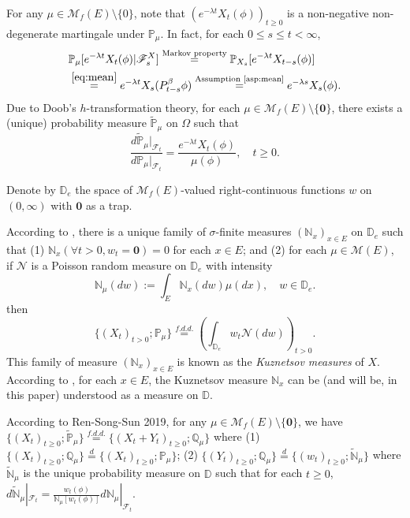 \documentclass[12pt,a4paper]{amsart}
\numberwithin{equation}{section}
\theoremstyle{plain}
\theoremstyle{definition}
\theoremstyle{remark}
\begin{document}
For any $\mu \in \mathcal M_f(E)\setminus\{0\}$, note that $(e^{- \lambda t} X_t(\phi))_{t\geq 0}$ is a non-negative non-degenerate martingale under $\mathbb P_\mu$.
In fact, for each $0\leq s\leq t< \infty$,
\begin{align}
&\mathbb P_\mu[e^{-\lambda t}X_t(\phi)|\mathscr F^X_s] 
\overset{\text{Markov property}} = \mathbb P_{X_s}[e^{-\lambda t} X_{t-s}(\phi)]
\\&\overset{\eqref{eq:mean}}= e^{-\lambda t}X_s(P_{t-s}^\beta \phi)
\overset{\text{Assumption \ref{asp:mean}}}=e^{-\lambda s}X_s(\phi).
\end{align}
Due to Doob's $h$-transformation theory, for each $\mu \in \mathcal M_f(E)\setminus\{\mathbf 0\}$, there exists a (unique) probability measure $\widetilde {\mathbb P}_\mu$  on $\Omega$ such that
\begin{equation} \label{eq: martingale transformation}
\frac{d\widetilde{\mathbb P}_\mu|_{\mathscr F_t}}{d\mathbb P_\mu|_{\mathscr F_t}}
=\frac{e^{-\lambda t}X_t(\phi)}{\mu(\phi) },
\quad t\geq 0.
\end{equation}

Denote by $\mathbb D_e$ the space of $\mathcal M_f(E)$-valued right-continuous functions $w$ on $(0,\infty)$ with $\mathbf 0$ as a trap.

According to \cite[Section 8.4]{Li2011Measure-valued}, there is a unique family of $\sigma$-finite measures $(\mathbb N_x)_{x\in E}$ on $\mathbb D_e$ such that (1) $\mathbb N_x (\forall t > 0, w_t =\mathbf 0) =0$ for each $x\in E$; and (2) for each $\mu \in \mathcal M(E)$, if $\mathcal N$ is a Poisson random measure on $\mathbb D_e$ with intensity
\[
\mathbb N_\mu(dw):= \int_E \mathbb N_x(dw)\mu(dx), \quad w\in \mathbb D_e.
\]
then
\[
\{(X_t)_{t> 0};\mathbb P_\mu\}
\overset{f.d.d.}{=} \left(\int_{\mathbb D_e} w_t\mathcal N(dw)\right)_{t> 0}.
\]
This family of measure $(\mathbb N_x)_{x\in E}$ is known as the \emph{Kuznetsov measures} of $X$.
According to \cite[Theorem 8.22]{Li2011Measure-valued}, for each $x\in E$, the Kuznetsov measure $\mathbb N_x$ can be (and will be, in this paper) understood as a measure on $\mathbb D$.


According to Ren-Song-Sun 2019, for any $\mu \in \mathcal M_f(E)\setminus \{\mathbf 0\}$, we have $\{(X_t)_{t\geq 0}; \widetilde {\mathbb P}_\mu\} \overset{f.d.d.} = \{ (X_t+ Y_t)_{t\geq 0}; \mathbb Q_\mu\} $ where (1) $\{(X_t)_{t\geq 0}; \mathbb Q_\mu\} \overset{d} =  \{(X_t)_{t\geq 0}; \mathbb P_\mu\}$; (2) $\{(Y_t)_{t\geq 0}; \mathbb Q_\mu \} \overset{d} = \{(w_t)_{t\geq 0}; \widetilde{ \mathbb N}_\mu\}$ where $\widetilde {\mathbb N}_\mu$ is the unique probability measure on $\mathbb D$ such that for each $t\geq 0$, $d \widetilde {\mathbb N}_\mu|_{\mathscr F_t} = \frac{w_t(\phi)}{\mathbb N_\mu[w_t(\phi)]} d\mathbb N_\mu|_{\mathscr F_t}$.
\end{document}
